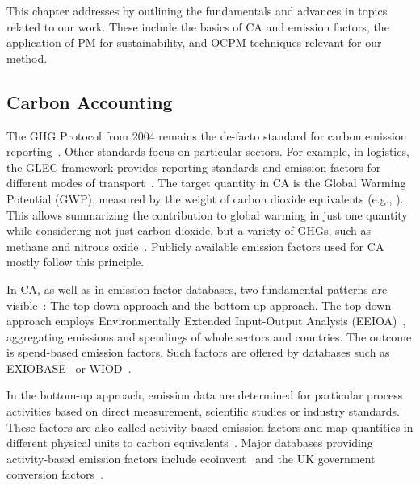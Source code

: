 This chapter addresses \RGone{} by outlining the fundamentals and advances in topics related to our work.
These include the basics of CA and emission factors, the application of PM for sustainability, and OCPM techniques relevant for our method.

\subsection*{Carbon Accounting}
\label{sec:rw-ca}


The GHG Protocol from 2004 remains the de-facto standard for carbon emission reporting~\cite{GHG:Corporate04}.
Other standards focus on particular sectors.
For example, in logistics, the GLEC framework provides reporting standards and emission factors for different modes of transport~\cite{GLEC3}.
The target quantity in CA is the Global Warming Potential (GWP), measured by the weight of carbon dioxide equivalents (e.g., \unit{\kgcotwoe}).
This allows summarizing the contribution to global warming in just one quantity while considering not just carbon dioxide, but a variety of GHGs, such as methane and nitrous oxide~\cite{Schaltegger12carbon}.
Publicly available emission factors used for CA mostly follow this principle.
%

In CA, as well as in emission factor databases, two fundamental patterns are visible~\cite{GHG:Corporate04}: The top-down approach and the bottom-up approach.
The top-down approach employs Environmentally Extended Input-Output Analy\-sis (EEIOA)~\cite{Davis10consumption}, aggregating emissions and spendings of whole sectors and countries. The outcome is spend-based emission factors.
Such factors are offered by databases such as EXIOBASE~\cite{Stadler18EXIOBASE} or WIOD~\cite{Timmer15WIOD}.

In the bottom-up approach, emission data are determined for particular process activities based on direct measurement, scientific studies or industry standards.
These factors are also called activity-based emission factors
and map quantities in different physical units to carbon equivalents~\cite{GHG:Corporate04}.
Major databases providing activity-based emission factors include
ecoinvent~\cite{ecoinvent24ecoinvent}
and the UK government conversion factors~\cite{UKGovCF24}.

